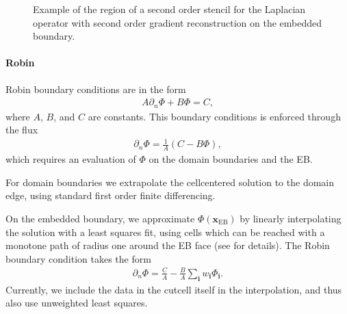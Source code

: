\documentclass[letterpaper,10pt,english]{sphinxmanual}
\let\sphinxpxdimen\pdfpxdimen\else\newdimen\sphinxpxdimen
\begin{document}
\begin{figure}[htb]
\centering
\capstart

\noindent\sphinxincludegraphics[width=360\sphinxpxdimen]{{StencilRegion}.png}
\caption{Example of the region of a second order stencil for the Laplacian operator with second order gradient reconstruction on the embedded boundary.}\label{\detokenize{Source/LinearSolvers:id3}}\label{\detokenize{Source/LinearSolvers:fig-stencilregion}}\end{figure}


\paragraph{Robin}
\label{\detokenize{Source/LinearSolvers:robin}}
Robin boundary conditions are in the form
\begin{equation*}
\begin{split}A\partial_n\Phi + B\Phi = C,\end{split}
\end{equation*}
where \(A\), \(B\), and \(C\) are constants.
This boundary conditions is enforced through the flux
\begin{equation*}
\begin{split}\partial_n\Phi = \frac{1}{A}\left(C - B\Phi\right),\end{split}
\end{equation*}
which requires an evaluation of \(\Phi\) on the domain boundaries and the EB.

For domain boundaries we extrapolate the cell\sphinxhyphen{}centered solution to the domain edge, using standard first order finite differencing.

On the embedded boundary, we approximate \(\Phi\left(\mathbf{x}_{\text{EB}}\right)\) by linearly interpolating the solution with a least squares fit, using cells which can be reached with a monotone path of radius one around the EB face (see {\hyperref[\detokenize{Utilities/LeastSquares:chap-leastsquares}]{}} for details).
The Robin boundary condition takes the form
\begin{equation*}
\begin{split}\partial_n\Phi = \frac{C}{A} - \frac{B}{A}\sum_{\mathbf{i}} w_{\mathbf{i}}\Phi_{\mathbf{i}}.\end{split}
\end{equation*}
Currently, we include the data in the cut\sphinxhyphen{}cell itself in the interpolation, and thus also use unweighted least squares.
\end{document}
